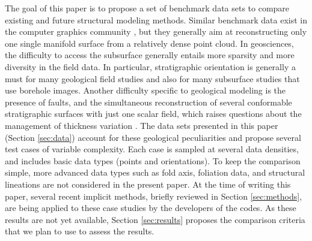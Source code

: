 \documentclass[preprint]{elsarticle}
\begin{document}


The goal of this paper is to propose a set of benchmark data sets to compare existing and future structural modeling methods. Similar benchmark data exist in the computer graphics community \citep[e.g.,][]{BLNTS13}, but they generally aim at reconstructing only one single manifold surface from a relatively dense point cloud. In geosciences, the difficulty to access the subsurface generally entails more sparsity and more diversity in the field data. In particular, stratigraphic orientation is generally a must for many geological field studies and also for many subsurface studies that use borehole images. Another difficulty specific to geological modeling is the presence of faults, and the simultaneous reconstruction of several conformable stratigraphic surfaces with just one scalar field, which raises questions about the management of thickness variation \citep{Laurent2016MG}. The data sets presented in this paper (Section \ref{sec:data}) account for these geological peculiarities and propose several test cases of variable complexity. Each case is sampled at several data densities, and includes basic data types (points and orientations). To keep the comparison simple, more advanced data types such as fold axis, foliation data, and structural lineations are not considered in the present paper. At the time of writing this paper, several recent implicit methods, briefly reviewed in Section \ref{sec:methods}, are being applied to these case studies by the developers of the codes. As these results are not yet available, Section \ref{sec:results} proposes the comparison criteria that we plan to use to assess the results. 
\end{document}
